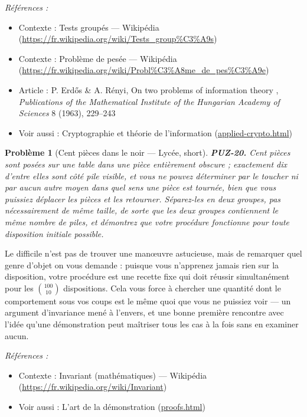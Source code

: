 \documentclass[11pt]{article}
\newtheorem{problem}{Problème}
\newenvironment{refs}{\par\small\noindent\emph{Références :}\begin{itemize}\setlength\itemsep{0pt}}{\end{itemize}\normalsize}
\begin{document}
\begin{refs}
\item Contexte : Tests groupés --- Wikipédia (\url{https://fr.wikipedia.org/wiki/Tests_group%C3%A9s})
\item Contexte : Problème de pesée --- Wikipédia (\url{https://fr.wikipedia.org/wiki/Probl%C3%A8me_de_pes%C3%A9e})
\item Article : P. Erd\H{o}s \& A. Rényi, \og{} On two problems of information theory \fg{}, \textit{Publications of the Mathematical Institute of the Hungarian Academy of Sciences} 8 (1963), 229--243
\item Voir aussi : Cryptographie et théorie de l'information (\url{applied-crypto.html})
\end{refs}

\bigskip

\begin{problem}[{Cent pièces dans le noir --- Lycée, short}]
\textbf{PUZ-20.} Cent pièces sont posées sur une table dans une pièce entièrement obscure ; exactement dix d'entre elles sont côté pile visible, et vous ne pouvez déterminer par le toucher ni par aucun autre moyen dans quel sens une pièce est tournée, bien que vous puissiez déplacer les pièces et les retourner. Séparez-les en deux groupes, pas nécessairement de même taille, de sorte que les deux groupes contiennent le même nombre de piles, et démontrez que votre procédure fonctionne pour toute disposition initiale possible.
\end{problem}

\noindent Le difficile n'est pas de trouver une man\oe{}uvre astucieuse, mais de remarquer quel genre d'objet on vous demande : puisque vous n'apprenez jamais rien sur la disposition, votre procédure est une recette fixe qui doit réussir simultanément pour les $ \binom{100}{10} $ dispositions. Cela vous force à chercher une quantité dont le comportement sous vos coups est le même quoi que vous ne puissiez voir --- un argument d'invariance mené à l'envers, et une bonne première rencontre avec l'idée qu'une démonstration peut maîtriser tous les cas à la fois sans en examiner aucun.

\begin{refs}
\item Contexte : Invariant (mathématiques) --- Wikipédia (\url{https://fr.wikipedia.org/wiki/Invariant})
\item Voir aussi : L'art de la démonstration (\url{proofs.html})
\end{refs}
\end{document}
